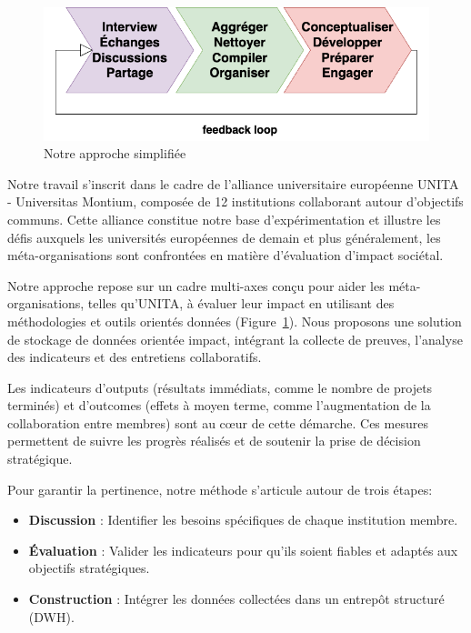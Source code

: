 \begin{figure}
    \centering
    \includegraphics[width=0.75\linewidth]{images/Diagrams-Simplified framework chain Our approach.png}
    \caption{Notre approche simplifiée}
    \label{fig:simplified-approach}
\end{figure}

Notre travail s’inscrit dans le cadre de l’alliance universitaire européenne UNITA - Universitas Montium, composée de 12 institutions collaborant autour d’objectifs communs. Cette alliance constitue notre base d’expérimentation et illustre les défis auxquels les universités européennes de demain et plus généralement, les méta-organisations sont confrontées en matière d’évaluation d’impact sociétal.

Notre approche repose sur un cadre multi-axes conçu pour aider les méta-organisations, telles qu’UNITA, à évaluer leur impact en utilisant des méthodologies et outils orientés données (Figure~\ref{fig:simplified-approach}). Nous proposons une solution de stockage de données orientée impact, intégrant la collecte de preuves, l’analyse des indicateurs et des entretiens collaboratifs.

Les indicateurs d’outputs (résultats immédiats, comme le nombre de projets terminés) et d’outcomes (effets à moyen terme, comme l’augmentation de la collaboration entre membres) sont au cœur de cette démarche. Ces mesures permettent de suivre les progrès réalisés et de soutenir la prise de décision stratégique. 

Pour garantir la pertinence, notre méthode s’articule autour de trois étapes:
\begin{itemize}
    \item \textbf{Discussion} : Identifier les besoins spécifiques de chaque institution membre.
    \item \textbf{Évaluation} : Valider les indicateurs pour qu’ils soient fiables et adaptés aux objectifs stratégiques.
    \item \textbf{Construction} : Intégrer les données collectées dans un entrepôt structuré (DWH).
\end{itemize}

